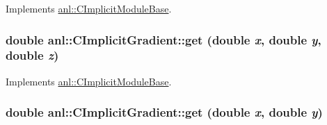 Implements \hyperlink{classanl_1_1CImplicitModuleBase_a3cf520bdab59631864253c03b4e1723f}{anl::CImplicitModuleBase}.\hypertarget{classanl_1_1CImplicitGradient_ae9cba8a20bb633f73c94118d6a644d70}{
\subsubsection[{get}]{\setlength{\rightskip}{0pt plus 5cm}double anl::CImplicitGradient::get (double {\em x}, \/  double {\em y}, \/  double {\em z})}}
\label{classanl_1_1CImplicitGradient_ae9cba8a20bb633f73c94118d6a644d70}


Implements \hyperlink{classanl_1_1CImplicitModuleBase_ac17d592612c82ba3d47f9229a00b1fe3}{anl::CImplicitModuleBase}.\hypertarget{classanl_1_1CImplicitGradient_a7e580d3643f735ba73177de4919935b7}{
\subsubsection[{get}]{\setlength{\rightskip}{0pt plus 5cm}double anl::CImplicitGradient::get (double {\em x}, \/  double {\em y})}}
\label{classanl_1_1CImplicitGradient_a7e580d3643f735ba73177de4919935b7}


